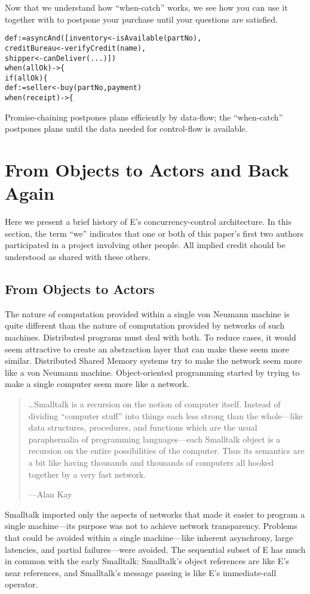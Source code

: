 \documentclass{llncs}
\begin{document}
Now that we understand how ``when-catch'' works, we see how you can
use it together with  to postpone your purchase until
your questions are satisfied.
%
\begin{alltt}
    def  := asyncAnd([inventory <- isAvailable(partNo),
                           creditBureau <- verifyCredit(name),
                           shipper <- canDeliver(...)])
    when (allOk) -> \{
        if (allOk) \{
            def  := seller <- buy(partNo, payment)
            when (receipt) -> \{
\end{alltt}
%
Promise-chaining postpones plans efficiently by data-flow; the
``when-catch'' postpones plans until the data needed for control-flow
is available.

\section{From Objects to Actors and Back Again}

Here we present a brief history of E's concurrency-control
architecture. In this section, the term ``we'' indicates that one or
both of this paper's first two authors participated in a project
involving other people. All implied credit should be understood as
shared with these others.

\subsection{From Objects to Actors}

The nature of computation provided within a single von Neumann machine
is quite different than the nature of computation provided by networks
of such machines. Distributed programs must deal with both. To reduce
cases, it would seem attractive to create an abstraction layer that
can make these seem more similar. Distributed Shared Memory systems
try to make the network seem more like a von Neumann
machine. Object-oriented programming started by trying to make a
single computer seem more like a network.
%
\begin{quotation}
\ldots Smalltalk is a recursion on the notion of computer
itself. Instead of dividing ``computer stuff'' into things each less
strong than the whole---like data structures, procedures, and
functions which are the usual paraphernalia of programming
languages---each Smalltalk object is a recursion on the entire
possibilities of the computer. Thus its semantics are a bit like
having thousands and thousands of computers all hooked together by a
very fast network.
\begin{flushright}
---Alan Kay \cite{kay:smallhistory}
\end{flushright}
\end{quotation}
%
Smalltalk imported only the aspects of networks that made it easier to
program a single machine---its purpose was not to achieve network
transparency. Problems that could be avoided within a single
machine---like inherent asynchrony, large latencies, and partial
failures---were avoided. The sequential subset of E
has much in common with the early Smalltalk: Smalltalk's object
references are like E's near references, and Smalltalk's message
passing is like E's immediate-call operator.
\end{document}

